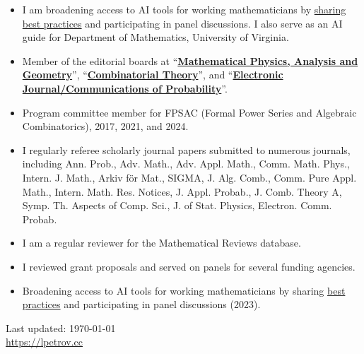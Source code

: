 \documentclass[letterpaper,11pt]{article}
\def\footerlink{https://lpetrov.cc}
\begin{document}
\begin{itemize}
	\item
	I am broadening access to AI tools for working mathematicians by \href{https://lpetrov.cc/AI-math/}{sharing} \href{https://storage.lpetrov.cc/research_files/talks/AI_UVA_Oct10.pdf}{best practices} and participating in panel discussions. I also serve as an AI guide for Department of Mathematics, University of Virginia.

	\item
	Member of the editorial boards at ``\href{https://www.springer.com/journal/11040}{\textbf{Mathematical Physics, Analysis and Geometry}}'', ``\href{https://escholarship.org/uc/combinatorial_theory/}{\textbf{Combinatorial Theory}}'', and ``\href{https://imstat.org/journals-and-publications/electronic-journal-of-probability/}{\textbf{Electronic Journal/Communications of Probability}}''.
	\item Program committee member for FPSAC (Formal Power Series and Algebraic Combinatorics),
		2017, 2021, and 2024.
	\item
	I regularly referee scholarly journal papers submitted to numerous journals,
	including
	Ann. Prob., Adv. Math., Adv. Appl. Math., Comm. Math. Phys., Intern. J. Math.,
	Arkiv f\"or Mat., SIGMA, J. Alg. Comb., Comm. Pure Appl. Math., Intern. Math.
	Res. Notices, J. Appl. Probab., J. Comb. Theory A, Symp. Th. Aspects of Comp.
	Sci., J. of Stat. Physics, Electron. Comm. Probab.
	\item
	I am a regular
	reviewer for the Mathematical Reviews database.
	\item
	I reviewed grant proposals and served on panels for several funding agencies.
	\item Broadening access to AI tools for working mathematicians by sharing \href{https://lpetrov.cc/AI-math/}{best practices} and participating in panel discussions (2023).
\end{itemize}


\bigskip

\begin{center}
	\begin{footnotesize}
		Last updated: \today \\ \href{\footerlink}{\url{\footerlink}}
	\end{footnotesize}
\end{center}
\end{document}
